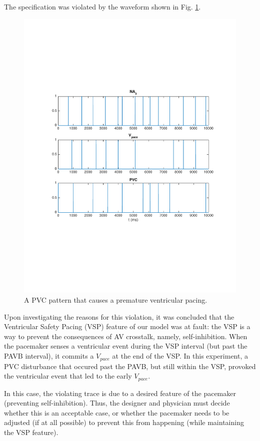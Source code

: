 The specification was violated by the waveform shown in Fig. \ref{fig:bug8_kept1}.
\begin{figure}[tb]
\centering
\includegraphics[width=0.7\linewidth]{figures/bug8_kept1}
\caption{A PVC pattern that causes a premature ventricular pacing.}
\label{fig:bug8_kept1}
\end{figure}
Upon investigating the reasons for this violation, it was concluded that the Ventricular Safety Pacing (VSP) feature of our model was at fault: the VSP is a way to prevent the consequences of AV crosstalk, namely, self-inhibition. 
When the pacemaker senses a ventricular event during the VSP interval (but past the PAVB interval), it commits a $V_{pace}$ at the end of the VSP.
In this experiment, a PVC disturbance that occured past the PAVB, but still within the VSP, provoked the ventricular event that led to the early $V_{pace}$.

In this case, the violating trace is due to a desired feature of the pacemaker (preventing self-inhibition).
Thus, the designer and physician must decide whether this is an acceptable case, or whether the pacemaker needs to be adjusted (if at all possible) to prevent this from happening (while maintaining the VSP feature).
